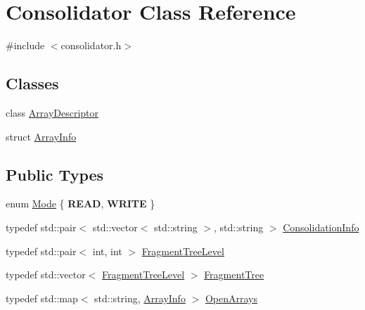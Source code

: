 \hypertarget{classConsolidator}{}\section{Consolidator Class Reference}
\label{classConsolidator}


{\ttfamily \#include $<$consolidator.\+h$>$}

\subsection*{Classes}
\begin{DoxyCompactItemize}
\item 
class \hyperlink{classConsolidator_1_1ArrayDescriptor}{Array\+Descriptor}
\item 
struct \hyperlink{structConsolidator_1_1ArrayInfo}{Array\+Info}
\end{DoxyCompactItemize}
\subsection*{Public Types}
\begin{DoxyCompactItemize}
\item 
enum \hyperlink{classConsolidator_abb45365555fb0f3aeca0f933027ca54d}{Mode} \{ {\bfseries R\+E\+A\+D}, 
{\bfseries W\+R\+I\+T\+E}
 \}
\item 
typedef std\+::pair$<$ std\+::vector$<$ std\+::string $>$, std\+::string $>$ \hyperlink{classConsolidator_a1b5064df8a7673a9cda8d079838309bf}{Consolidation\+Info}
\item 
typedef std\+::pair$<$ int, int $>$ \hyperlink{classConsolidator_a288ab0c18a45005d380dd70cca50227f}{Fragment\+Tree\+Level}
\item 
typedef std\+::vector$<$ \hyperlink{classConsolidator_a288ab0c18a45005d380dd70cca50227f}{Fragment\+Tree\+Level} $>$ \hyperlink{classConsolidator_a34bc002a0189718ae47bb2e934a8300f}{Fragment\+Tree}
\item 
typedef std\+::map$<$ std\+::string, \hyperlink{structConsolidator_1_1ArrayInfo}{Array\+Info} $>$ \hyperlink{classConsolidator_ab77c160cb92e14ce01e353c4b200bb74}{Open\+Arrays}
\end{DoxyCompactItemize}
